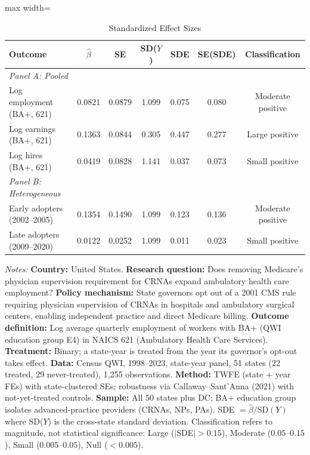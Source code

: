 
\begin{table}[htbp]
\centering
\caption{Standardized Effect Sizes}
\label{tab:sde}
\begin{threeparttable}\footnotesize
\begin{adjustbox}{max width=\textwidth}
\begin{tabular}{lcccccc}
\toprule
Outcome & $\hat{\beta}$ & SE & SD($Y$) & SDE & SE(SDE) & Classification \\
\midrule
\textit{Panel A: Pooled} & & & & & & \\
Log employment (BA+, 621) & 0.0821 & 0.0879 & 1.099 & 0.075 & 0.080 & Moderate positive \\
Log earnings (BA+, 621)   & 0.1363 & 0.0844 & 0.305 & 0.447 & 0.277 & Large positive \\
Log hires (BA+, 621)      & 0.0419 & 0.0828 & 1.141 & 0.037 & 0.073 & Small positive \\
\addlinespace
\textit{Panel B: Heterogeneous} & & & & & & \\
Early adopters (2002--2005) & 0.1354 & 0.1490 & 1.099 & 0.123 & 0.136 & Moderate positive \\
Late adopters (2009--2020)  & 0.0122 & 0.0252 & 1.099 & 0.011 & 0.023 & Small positive \\
\bottomrule
\end{tabular}
\end{adjustbox}
\begin{tablenotes}[flushleft]
\footnotesize
\item \textit{Notes:}
\textbf{Country:} United States.
\textbf{Research question:} Does removing Medicare's physician supervision requirement for CRNAs expand ambulatory health care employment?
\textbf{Policy mechanism:} State governors opt out of a 2001 CMS rule requiring physician supervision of CRNAs in hospitals and ambulatory surgical centers, enabling independent practice and direct Medicare billing.
\textbf{Outcome definition:} Log average quarterly employment of workers with BA+ (QWI education group E4) in NAICS 621 (Ambulatory Health Care Services).
\textbf{Treatment:} Binary; a state-year is treated from the year its governor's opt-out takes effect.
\textbf{Data:} Census QWI, 1998--2023, state-year panel, 51 states (22 treated, 29 never-treated), 1,255 observations.
\textbf{Method:} TWFE (state + year FEs) with state-clustered SEs; robustness via Callaway--Sant'Anna (2021) with not-yet-treated controls.
\textbf{Sample:} All 50 states plus DC; BA+ education group isolates advanced-practice providers (CRNAs, NPs, PAs).
SDE $= \hat{\beta} / \text{SD}(Y)$ where SD($Y$) is the cross-state standard deviation.
Classification refers to magnitude, not statistical significance:
Large ($|$SDE$| > 0.15$), Moderate ($0.05$--$0.15$), Small ($0.005$--$0.05$), Null ($< 0.005$).
\end{tablenotes}
\end{threeparttable}
\end{table}

